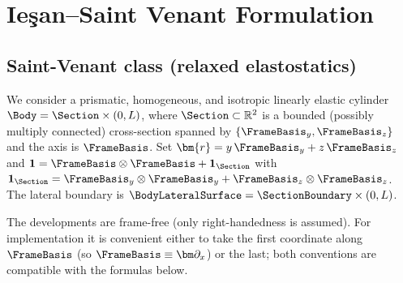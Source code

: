 
\section{Ie\c{s}an--Saint Venant Formulation}

\subsection{Saint-Venant class (relaxed elastostatics)}

We consider a prismatic, homogeneous, and isotropic linearly elastic cylinder
\(
\Body=\Section\times(0,L)
\),
where \(\Section\subset\mathbb{R}^2\) is a bounded (possibly multiply connected) cross-section
spanned by \(\{\FrameBasis_y,\FrameBasis_z\}\) and the axis is \(\FrameBasis\).
Set \(\bm{r}=y\,\FrameBasis_y+z\,\FrameBasis_z\) and
\(
\mathbf{1}=\FrameBasis\otimes\FrameBasis+\mathbf{1}_\Section
\)
with
\(
\mathbf{1}_\Section=\FrameBasis_y\otimes\FrameBasis_y+\FrameBasis_z\otimes\FrameBasis_z
\).
The lateral boundary is \(\BodyLateralSurface=\SectionBoundary\times(0,L)\).

\begin{remark}
The developments are frame-free (only right-handedness is assumed). For implementation it is convenient
either to take the first coordinate along \(\FrameBasis\) (so \(\FrameBasis\equiv\bm\partial_x\)) or the last;
both conventions are compatible with the formulas below.
\end{remark}


